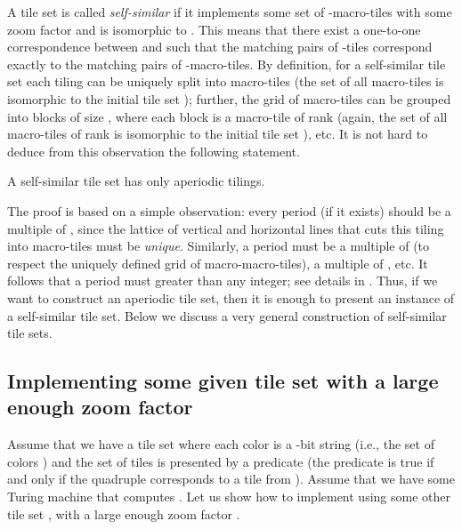 \documentclass[runningheads]{llncs}
\begin{document}
A  tile set  is called \emph{self-similar} if it implements some set  of -macro-tiles with some zoom factor  and  is isomorphic to . 
This means that there exist a one-to-one correspondence between  and  such that
the matching pairs of -tiles correspond exactly to the matching pairs of -macro-tiles.
By definition, for a  self-similar tile set  each tiling can be uniquely split into  macro-tiles (the set of all macro-tiles is isomorphic to the initial tile set );  further, the grid of macro-tiles can be grouped into blocks of size , where each block is a macro-tile of rank  (again, the set of all macro-tiles of rank  is isomorphic to the initial tile set ), etc. It is not hard to deduce from this observation the following statement.
\begin{proposition}[folklore] \label{thm-folklore}
A self-similar tile set  has only aperiodic tilings.
 \end{proposition}
The proof is based on a simple observation: every period (if it exists) should be a multiple of , since  the lattice of vertical and horizontal lines that cuts this tiling into  macro-tiles must be \emph{unique}. Similarly, a period must be a  multiple of  (to respect the uniquely defined grid of macro-macro-tiles), a  multiple of , etc. It follows that a period must greater than any integer; see details in \cite{drs}.
Thus, if we want to construct an aperiodic tile set, then it is enough to present an instance of a self-similar tile set.
 Below we discuss a very general construction of self-similar tile sets.
 
 \subsection{Implementing some given tile set with a large enough zoom factor}


 Assume that we have a tile set  where each color is a -bit string (i.e., the set of colors ) and the set of tiles  is presented by a predicate  (the predicate is true if and only if the quadruple  corresponds to a tile from ). Assume that we have some Turing machine  that computes . Let us show how to implement  using some other tile set , with a large enough zoom factor .
 
\end{document}
